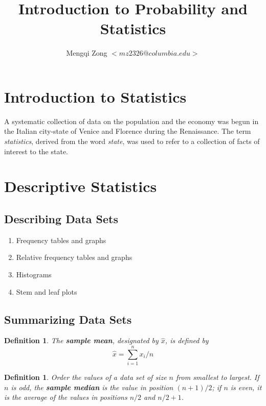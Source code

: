 \documentclass[12pt]{article}
\title{Introduction to Probability and Statistics}
\author{Mengqi Zong $<mz2326@columbia.edu>$}
\newtheorem{definition}[theorem]{Definition}
\begin{document}
\maketitle

\tableofcontents

\setlength{\parindent}{0in}

\section{Introduction to Statistics}

A systematic collection of data on the population and the economy was begun in the Italian city-state of Venice and Florence during the Renaissance. The term \emph{statistics}, derived from the word \emph{state}, was used to refer to a collection of facts of interest to the state.

\section{Descriptive Statistics}

\subsection{Describing Data Sets}
\begin{enumerate}
  \item Frequency tables and graphs
  \item Relative frequency tables and graphs
  \item Histograms
  \item Stem and leaf plots
\end{enumerate}

\subsection{Summarizing Data Sets}

\begin{definition}
  The \textbf{sample mean}, designated by $\hat{x}$, is defined by
  \begin{equation*}
    \hat{x} = \sum_{i=1}^n x_i / n
  \end{equation*}
\end{definition}

\begin{definition}
  Order the values of a data set of size $n$ from smallest to largest. If $n$ is odd, the \textbf{sample median} is the value in position $(n+1)/2$; if $n$ is even, it is the average of the values in positions $n/2$ and $n/2+1$.
\end{definition}
\end{document}
